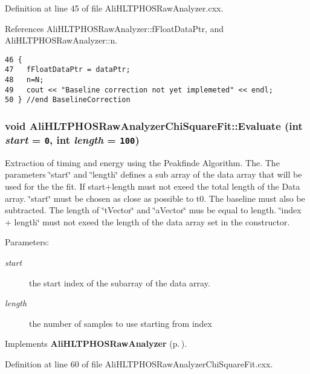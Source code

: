 Definition at line 45 of file Ali\-HLTPHOSRaw\-Analyzer.cxx.

References Ali\-HLTPHOSRaw\-Analyzer::f\-Float\-Data\-Ptr, and Ali\-HLTPHOSRaw\-Analyzer::n.

\footnotesize\begin{verbatim}46 {
47   fFloatDataPtr = dataPtr;  
48   n=N;
49   cout << "Baseline correction not yet implemeted" << endl;
50 } //end BaselineCorrection
\end{verbatim}\normalsize 


\subsubsection{\setlength{\rightskip}{0pt plus 5cm}void Ali\-HLTPHOSRaw\-Analyzer\-Chi\-Square\-Fit::Evaluate (int {\em start} = {\tt 0}, int {\em length} = {\tt 100})\hspace{0.3cm}{\tt  [virtual]}}\label{classAliHLTPHOSRawAnalyzerChiSquareFit_AliHLTPHOSRawAnalyzerChiSquareFita4}


Extraction of timing and energy using the Peakfinde Algorithm. The. The parameters \char`\"{}start\char`\"{} and \char`\"{}length\char`\"{} defines a sub array of the data array that will be used for the the fit. If start+length must not exeed the total length of the Data array. \char`\"{}start\char`\"{} must be chosen as close as possible to t0. The baseline must also be subtracted. The length of \char`\"{}t\-Vector\char`\"{} and \char`\"{}a\-Vector\char`\"{} mus be equal to length. \char`\"{}index + length\char`\"{} must not exeed the length of the data array set in the constructor. \begin{Desc}
\item[Parameters:]
\begin{description}
\item[{\em start}]the start index of the subarray of the data array. \item[{\em length}]the number of samples to use starting from index \end{description}
\end{Desc}


Implements {\bf Ali\-HLTPHOSRaw\-Analyzer} {\rm (p.\,\pageref{classAliHLTPHOSRawAnalyzer_AliHLTPHOSRawAnalyzera14})}.

Definition at line 60 of file Ali\-HLTPHOSRaw\-Analyzer\-Chi\-Square\-Fit.cxx.


